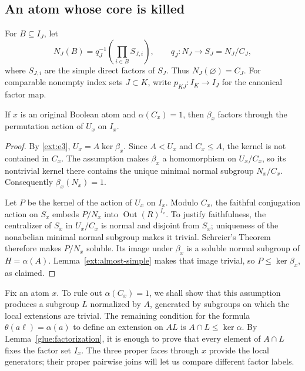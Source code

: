\subsection{An atom whose core is killed}

For $B\subseteq I_J$, let
\begin{equation}\label{glue:support-preimage}
 N_J(B)=q_J^{-1}\left(\prod_{i\in B}S_{J,i}\right),
 \qquad
 q_J:N_J\longrightarrow S_J=N_J/C_J,
\end{equation}
where $S_{J,i}$ are the simple direct factors of $S_J$.
Thus $N_J(\varnothing)=C_J$.  For comparable nonempty index sets
$J\subset K$, write $p_{KJ}:I_K\to I_J$ for the canonical factor map.

\begin{lemma}\label{glue:factorization}
If $x$ is an original Boolean atom and $\alpha(C_x)=1$, then
$\beta_x$ factors through the permutation action of $U_x$ on $I_x$.
\end{lemma}
\begin{proof}
By \ref{ext:e3}, $U_x=A\ker\beta_x$.  Since $A<U_x$ and $C_x\le A$,
the kernel is not contained in $C_x$.  The assumption makes
$\beta_x$ a homomorphism on $U_x/C_x$, so its nontrivial kernel there
contains the unique minimal normal subgroup $N_x/C_x$.
Consequently $\beta_x(N_x)=1$.

Let $P$ be the kernel of the action of $U_x$ on $I_x$.
Modulo $C_x$, the faithful conjugation action on $S_x$ embeds
$P/N_x$ into $\operatorname{Out}(R)^{I_x}$.  To justify faithfulness,
the centralizer of $S_x$ in $U_x/C_x$ is normal and disjoint from
$S_x$; uniqueness of the nonabelian minimal normal subgroup makes it
trivial.  Schreier's Theorem therefore makes $P/N_x$ soluble.
Its image under $\beta_x$ is a soluble normal subgroup of
$H=\alpha(A)$.  Lemma~\ref{ext:almost-simple} makes that image trivial,
so $P\le\ker\beta_x$, as claimed.
\end{proof}

Fix an atom $x$.  To rule out $\alpha(C_x)=1$, we shall show that this assumption
produces a subgroup $L$ normalized by $A$, generated by subgroups on
which the local extensions are trivial.  The remaining
condition for the formula $\theta(a\ell)=\alpha(a)$ to define an
extension on $AL$ is $A\cap L\le\ker\alpha$.  By Lemma~\ref{glue:factorization}, it is
enough to prove that every element of $A\cap L$ fixes the factor set
$I_x$.  The three proper faces through $x$ provide the local generators;
their proper pairwise joins will let us compare different factor labels.

